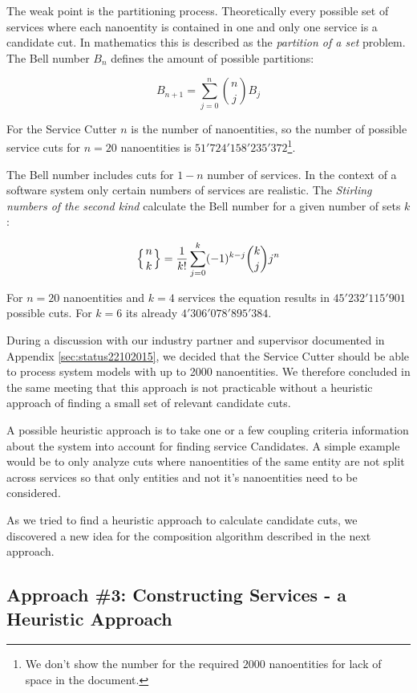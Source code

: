 The weak point is the partitioning process. Theoretically every possible set of services where each nanoentity is contained in one and only one service is a candidate cut. In mathematics this is described as the \textit{partition of a set}\cite{partitionOfASet} problem. The Bell number $B_n$ defines the amount of possible partitions: 


\begin{displaymath}
B_{n+1}=\sum_{j=0}^n {n\choose j} B_j
\end{displaymath}

For the Service Cutter $n$ is the number of nanoentities, so the number of possible service cuts for $n=20$ nanoentities is $51'724'158'235'372$\footnote{We don't show the number for the required $2000$ nanoentities for lack of space in the document.}.

The Bell number includes cuts for $1 - n$ number of services. In the context of a software system only certain numbers of services are realistic. The \textit{Stirling numbers of the second kind} calculate the Bell number for a given number of sets $k$:

\begin{displaymath}
\left\{ {n \atop k}\right\} = \frac{1}{k!}\sum_{j=0}^{k} (-1)^{k-j} \binom{k}{j} j^n
\end{displaymath}

For $n=20$ nanoentities and $k=4$ services the equation results in $45'232'115'901$ possible cuts. For $k=6$ its already $4'306'078'895'384$.

During a discussion with our industry partner and supervisor documented in Appendix \ref{sec:status22102015}, we decided that the Service Cutter should be able to process system models with up to 2000 nanoentities. We therefore concluded in the same meeting that this approach is not practicable without a heuristic approach of finding a small set of relevant candidate cuts. 

A possible heuristic approach is to take one or a few coupling criteria information about the system into account for finding service Candidates. A simple example would be to only analyze cuts where nanoentities of the same entity are not split across services so that only entities and not it's nanoentities need to be considered.

As we tried to find a heuristic approach to calculate candidate cuts, we discovered a new idea for the composition algorithm described in the next approach. 

\subsection{Approach \#3: Constructing Services - a Heuristic Approach}

